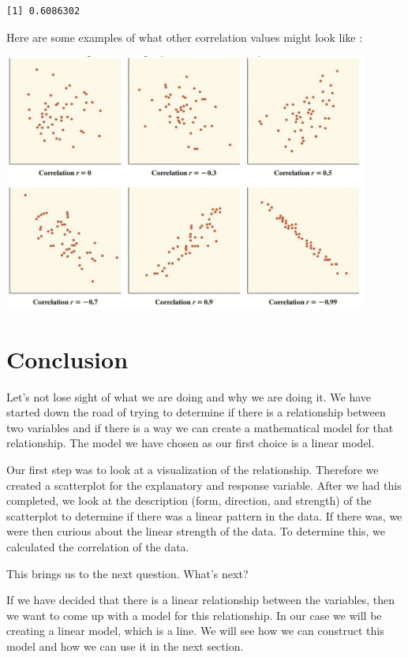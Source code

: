\documentclass[
  letterpaper,
  DIV=11,
  numbers=noendperiod]{scrreprt}
\begin{document}
\begin{verbatim}
[1] 0.6086302
\end{verbatim}

Here are some examples of what other correlation values might look like
:

\includegraphics[width=0.9\textwidth,height=\textheight]{./images/SC_8.jpg}

\section*{Conclusion}\label{conclusion-3}


Let's not lose sight of what we are doing and why we are doing it. We
have started down the road of trying to determine if there is a
relationship between two variables and if there is a way we can create a
mathematical model for that relationship. The model we have chosen as
our first choice is a linear model.

Our first step was to look at a visualization of the relationship.
Therefore we created a scatterplot for the explanatory and response
variable. After we had this completed, we look at the description (form,
direction, and strength) of the scatterplot to determine if there was a
linear pattern in the data. If there was, we were then curious about the
linear strength of the data. To determine this, we calculated the
correlation of the data.

This brings us to the next question. What's next?

If we have decided that there is a linear relationship between the
variables, then we want to come up with a model for this relationship.
In our case we will be creating a linear model, which is a line. We will
see how we can construct this model and how we can use it in the next
section.
\end{document}
